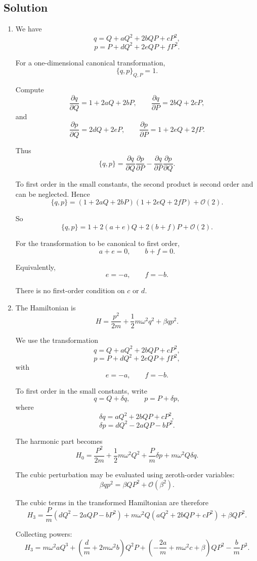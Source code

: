 \documentclass[11pt, a4paper]{article} %
\begin{document}
\subsection*{Solution}
\begin{enumerate}
\item[(1)] We have
\[
q=Q+aQ^2+2bQP+cP^2,
\]
\[
p=P+dQ^2+2eQP+fP^2.
\]

For a one-dimensional canonical transformation,
\[
\{q,p\}_{Q,P}=1.
\]

Compute
\[
\frac{\partial q}{\partial Q}
=
1+2aQ+2bP,
\qquad
\frac{\partial q}{\partial P}
=
2bQ+2cP,
\]
and
\[
\frac{\partial p}{\partial Q}
=
2dQ+2eP,
\qquad
\frac{\partial p}{\partial P}
=
1+2eQ+2fP.
\]

Thus
\[
\{q,p\}
=
\frac{\partial q}{\partial Q}\frac{\partial p}{\partial P}
-
\frac{\partial q}{\partial P}\frac{\partial p}{\partial Q}.
\]

To first order in the small constants, the second product is second order and can be neglected. Hence
\[
\{q,p\}
=
(1+2aQ+2bP)(1+2eQ+2fP)
+
\mathcal O(2).
\]

So
\[
\{q,p\}
=
1+2(a+e)Q+2(b+f)P+\mathcal O(2).
\]

For the transformation to be canonical to first order,
\[
\boxed{
a+e=0,
\qquad
b+f=0.
}
\]

Equivalently,
\[
\boxed{
e=-a,
\qquad
f=-b.
}
\]

There is no first-order condition on \(c\) or \(d\).

\item[(2)] The Hamiltonian is
\[
H=
\frac{p^2}{2m}
+
\frac12 m\omega^2q^2
+
\beta q p^2.
\]

We use the transformation
\[
q=Q+aQ^2+2bQP+cP^2,
\]
\[
p=P+dQ^2+2eQP+fP^2,
\]
with
\[
e=-a,
\qquad
f=-b.
\]

To first order in the small constants, write
\[
q=Q+\delta q,
\qquad
p=P+\delta p,
\]
where
\[
\delta q=aQ^2+2bQP+cP^2,
\]
\[
\delta p=dQ^2-2aQP-bP^2.
\]

The harmonic part becomes
\[
H_0
=
\frac{P^2}{2m}
+
\frac12 m\omega^2Q^2
+
\frac{P}{m}\delta p
+
m\omega^2Q\delta q.
\]

The cubic perturbation may be evaluated using zeroth-order variables:
\[
\beta q p^2
=
\beta QP^2+\mathcal O(\beta^2).
\]

The cubic terms in the transformed Hamiltonian are therefore
\[
H_3
=
\frac{P}{m}
\left(dQ^2-2aQP-bP^2\right)
+
m\omega^2Q
\left(aQ^2+2bQP+cP^2\right)
+
\beta QP^2.
\]

Collecting powers:
\[
H_3
=
m\omega^2 a Q^3
+
\left(\frac{d}{m}+2m\omega^2 b\right)Q^2P
+
\left(-\frac{2a}{m}+m\omega^2 c+\beta\right)QP^2
-
\frac{b}{m}P^3.
\]


\end{enumerate}
\end{document}
